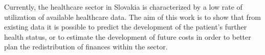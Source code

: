 
Currently, the healthcare sector in Slovakia is characterized by a low rate of utilization of available healthcare data. The aim of this work is to show that from existing data it is possible to predict the development of the patient's further health status, or to estimate the development of future costs in order to better plan the redistribution of finances within the sector.